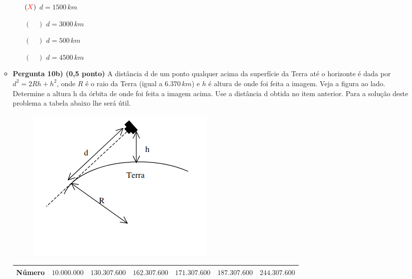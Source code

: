 \documentclass[a4paper, 12pt]{article}
\newcommand{\red}[1]{\textcolor{red}{#1}}
\begin{document}
\begin{flushleft}
\begin{itemize}
\begin{itemize}
\begin{figure}[H]
                        \end{figure}
                        \begin{itemize}
                            \item[$(\red{X})$] $d = 1500 \, km$
                            \item[$(\quad)$] $d = 3000 \, km$
                            \item[$(\quad)$] $d = 500 \, km$
                            \item[$(\quad)$] $d = 4500 \, km$
                        \end{itemize}
                    \item \textbf{Pergunta 10b) (0,5 ponto)} A distância d de um ponto qualquer acima da superfície da Terra até o horizonte é dada por $d^2 = 2Rh + h^2$, onde $R$ é o raio da Terra (igual a $6.370 \, km$) e $h$ é altura de onde foi feita a imagem. Veja a figura ao lado. Determine a altura h da órbita de onde foi feita a imagem acima. Use a distância d obtida no item anterior. Para a solução deste problema a tabela abaixo lhe será útil.
                        \begin{figure}[H]
                            \centering
                            \includegraphics[scale=0.5]{img/10b.png}
                        \end{figure}
                        \begin{center} \begin{tabular}
                        {
                            |M{0.1\textwidth}|M{0.11\textwidth}|M{0.11\textwidth}|M{0.11\textwidth}|M{0.11\textwidth}|M{0.11\textwidth}|M{0.11\textwidth}|
                        }
                            \hline
                            Número & $10.000.000$ & $130.307.600$ & $162.307.600$ & $171.307.600$ & $187.307.600$ & $244.307.600$ \\ \hline

\end{tabular}
\end{center}
\end{itemize}
\end{itemize}
\end{flushleft}
\end{document}
